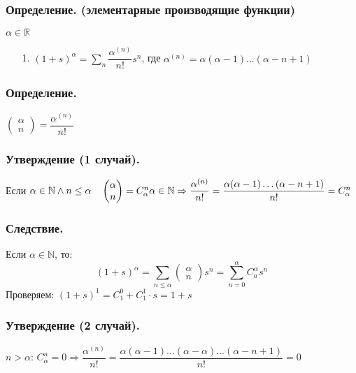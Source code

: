 \documentclass[12pt, letterpaper, twoside]{article}
\newcommand{\mb}[1]{\mathbb{#1}}
\begin{document}
    \subsubsection*{Определение. (элементарные производящие функции)}
    $\alpha \in \mb{R}$
    \begin{enumerate}
        \item[1.] $(1 + s)^{\alpha} = \sum_{n} \dfrac{\alpha^{(n)}}{n!}s^n$, где $\alpha^{(n)} = \alpha (\alpha - 1)\dots (\alpha - n + 1)$
    \end{enumerate}
    \subsubsection*{Определение.}
    $\begin{pmatrix}
        \alpha\\
        n
    \end{pmatrix} = \dfrac{\alpha^{(n)}}{n!}$
    \subsubsection*{Утверждение (1 случай).}
    Если $\alpha \in \mb{N}\wedge n \leq \alpha\quad \begin{pmatrix}
        \alpha\\
        n
    \end{pmatrix} = C^n_{\alpha}\\
    \alpha \in \mb{N}\Rightarrow \dfrac{\alpha^{(n)}}{n!} = \dfrac{\alpha (\alpha - 1)\dots (\alpha - n + 1)}{n!} = C_{\alpha}^n$
    \subsubsection*{Следствие.}
    Если $\alpha \in \mb{N}$, то:
    \[(1 + s)^{\alpha} = \sum_{n \leq \alpha} \begin{pmatrix}
        \alpha\\
        n
    \end{pmatrix} s^n = \sum_{n = 0}^{\alpha} C_a^{\alpha}s^n\]
    Проверяем: $(1 + s)^1 = C^0_1 + C_1^1\cdot s = 1 + s$
    \subsubsection*{Утверждение (2 случай).}
    $n > \alpha$:
    $C_{\alpha}^{n} = 0\Rightarrow \dfrac{\alpha^{(n)}}{n!} = \dfrac{\alpha (\alpha - 1)\dots (\alpha - \alpha)\dots (\alpha - n + 1)}{n!} = 0$
\end{document}
